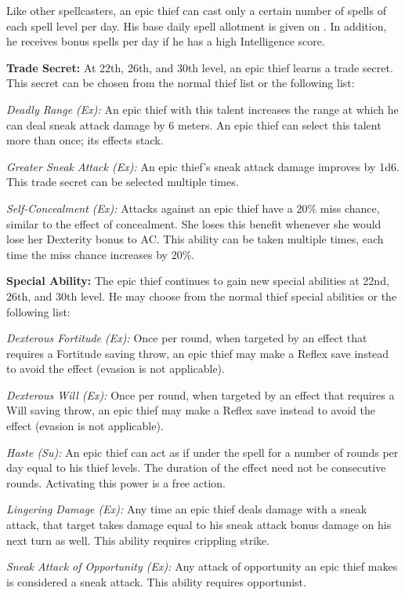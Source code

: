 Like other spellcasters, an epic thief can cast only a certain number of spells of each spell level per day. His base daily spell allotment is given on . In addition, he receives bonus spells per day if he has a high Intelligence score.

\textbf{Trade Secret:} At 22th, 26th, and 30th level, an epic thief learns a trade secret. This secret can be chosen from the normal thief list or the following list:

\textit{Deadly Range (Ex):} An epic thief with this talent increases the range at which he can deal sneak attack damage by 6 meters. An epic thief can select this talent more than once; its effects stack.

\textit{Greater Sneak Attack (Ex):} An epic thief's sneak attack damage improves by 1d6. This trade secret can be selected multiple times.

\textit{Self-Concealment (Ex):} Attacks against an epic thief have a 20\% miss chance, similar to the effect of concealment. She loses this benefit whenever she would lose her Dexterity bonus to AC. This ability can be taken multiple times, each time the miss chance increases by 20\%.


\textbf{Special Ability:} The epic thief continues to gain new special abilities at 22nd, 26th, and 30th level. He may choose from the normal thief special abilities or the following list:

\textit{Dexterous Fortitude (Ex):} Once per round, when targeted by an effect that requires a Fortitude saving throw, an epic thief may make a Reflex save instead to avoid the effect (evasion is not applicable).

\textit{Dexterous Will (Ex):} Once per round, when targeted by an effect that requires a Will saving throw, an epic thief may make a Reflex save instead to avoid the effect (evasion is not applicable).

\textit{Haste (Su):} An epic thief can act as if under the  spell for a number of rounds per day equal to \onefifth his thief levels. The duration of the effect need not be consecutive rounds. Activating this power is a free action.

\textit{Lingering Damage (Ex):} Any time an epic thief deals damage with a sneak attack, that target takes damage equal to his sneak attack bonus damage on his next turn as well. This ability requires crippling strike.

\textit{Sneak Attack of Opportunity (Ex):} Any attack of opportunity an epic thief makes is considered a sneak attack. This ability requires opportunist.


